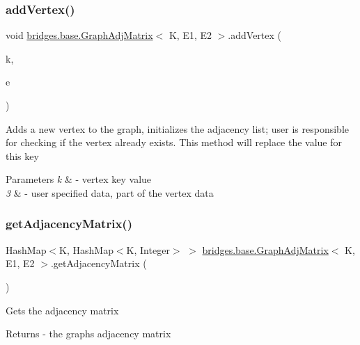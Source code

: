 \subsubsection{\texorpdfstring{add\+Vertex()}{addVertex()}}
{\footnotesize\ttfamily void \mbox{\hyperlink{classbridges_1_1base_1_1_graph_adj_matrix}{bridges.\+base.\+Graph\+Adj\+Matrix}}$<$ K, E1, E2 $>$.add\+Vertex (\begin{DoxyParamCaption}\item[{K}]{k,  }\item[{E1}]{e }\end{DoxyParamCaption})}

Adds a new vertex to the graph, initializes the adjacency list; user is responsible for checking if the vertex already exists. This method will replace the value for this key


\begin{DoxyParams}{Parameters}
{\em k} & -\/ vertex key value \\
\hline
{\em 3} & -\/ user specified data, part of the vertex data \\
\hline
\end{DoxyParams}
\mbox{\label{classbridges_1_1base_1_1_graph_adj_matrix_abe7f26cb9874744bc044df18b5d0eb84}} 
\subsubsection{\texorpdfstring{get\+Adjacency\+Matrix()}{getAdjacencyMatrix()}\hspace{0.1cm}{\footnotesize\ttfamily [1/2]}}
{\footnotesize\ttfamily Hash\+Map$<$K, Hash\+Map$<$K, Integer$>$ $>$ \mbox{\hyperlink{classbridges_1_1base_1_1_graph_adj_matrix}{bridges.\+base.\+Graph\+Adj\+Matrix}}$<$ K, E1, E2 $>$.get\+Adjacency\+Matrix (\begin{DoxyParamCaption}{ }\end{DoxyParamCaption})}

Gets the adjacency matrix

\begin{DoxyReturn}{Returns}
-\/ the graph\textquotesingle{}s adjacency matrix 
\end{DoxyReturn}
\mbox{\label{classbridges_1_1base_1_1_graph_adj_matrix_a43f830cfe126f2be351f6d8c2fccc569}} 

